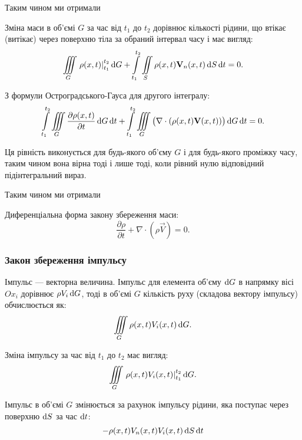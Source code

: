 Таким чином ми отримали
\begin{law}
	\label{laq:mass-conservation}
	Зміна маси в об'ємі $G$ за час від $t_1$ до $t_2$ дорівнює кількості рідини, що втікає (витікає) через поверхню тіла за обраний інтервал часу і має вигляд:
	\begin{equation}
		\displaystyle\iiint\limits_G \left. \rho(x, t) \right|_{t_1}^{t_2} \mathop{}\!\mathrm{d} G + \displaystyle\int\limits_{t_1}^{t_2} \displaystyle\iint\limits_S \rho(x, t) \textbf{V}_n(x, t) \mathop{}\!\mathrm{d} S \mathop{}\!\mathrm{d} t = 0.
	\end{equation}
\end{law}

З формули Остроградського-Гауса для другого інтегралу:
\begin{equation}
	\displaystyle\int\limits_{t_1}^{t_2} \displaystyle\iiint\limits_G \frac{\partial \rho(x, t)}{\partial t} \mathop{}\!\mathrm{d} G \mathop{}\!\mathrm{d} t+ \displaystyle\int\limits_{t_1}^{t_2} \displaystyle\iiint\limits_G \big( \nabla \cdot ( \rho(x, t) \textbf{V}(x, t)) \big) \mathop{}\!\mathrm{d} G \mathop{}\!\mathrm{d} t = 0.
\end{equation}

Ця рівність виконується для будь-якого об'єму $G$ і для будь-якого проміжку часу, таким чином вона вірна тоді і лише тоді, коли рівний нулю відповідний підінтегральний вираз. \medskip

Таким чином ми отримали
\begin{th_equation}[нерозривності]
	Диференціальна форма закону збереження маси:
	\begin{equation}
		\frac{\partial \rho}{\partial t} + \nabla \cdot \left( \rho \vec V \right) = 0.
	\end{equation}
\end{th_equation}

\subsubsection{Закон збереження імпульсу}

Імпульс --- векторна величина. Імпульс для елемента об'єму $\mathop{}\!\mathrm{d} G$ в напрямку вісі $Ox_i$ дорівнює $\rho V_i \mathop{}\!\mathrm{d} G$, тоді в об'ємі $G$ кількість руху (складова вектору імпульсу) обчислюється як:
\begin{equation}
	\displaystyle\iiint\limits_G \rho(x, t) V_i(x, t) \mathop{}\!\mathrm{d} G.
\end{equation}

Зміна імпульсу за час від $t_1$ до $t_2$ має вигляд: 
\begin{equation}
	\displaystyle\iiint\limits_G \left. \rho(x, t) V_i(x, t) \right|_{t_1}^{t_2} \mathop{}\!\mathrm{d} G.
\end{equation}

Імпульс в об'ємі $G$ змінюється за рахунок імпульсу рідини, яка поступає через поверхню $\mathop{}\!\mathrm{d} S$ за час $\mathop{}\!\mathrm{d} t$:
\begin{equation}
	- \rho(x, t) V_n(x, t) V_i(x, t) \mathop{}\!\mathrm{d} S \mathop{}\!\mathrm{d} t
\end{equation}

